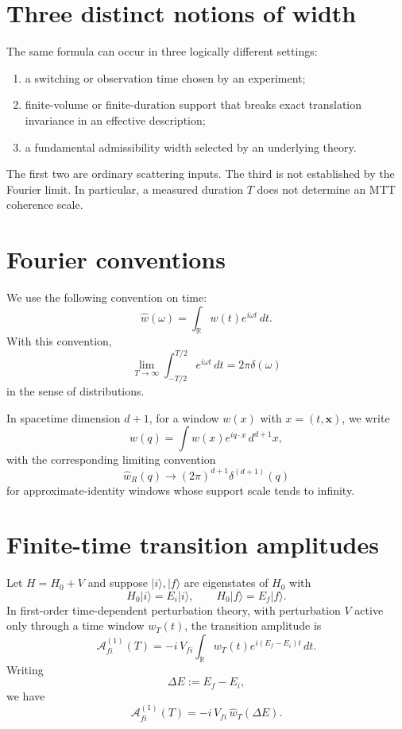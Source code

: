 \documentclass[11pt]{article}
\begin{document}
\section{Three distinct notions of width}

The same formula can occur in three logically different settings:
\begin{enumerate}
\item a switching or observation time chosen by an experiment;
\item finite-volume or finite-duration support that breaks exact translation invariance in an
effective description;
\item a fundamental admissibility width selected by an underlying theory.
\end{enumerate}
The first two are ordinary scattering inputs.  The third is not established by the Fourier
limit.  In particular, a measured duration \(T\) does not determine an MTT coherence scale.

\section{Fourier conventions}

We use the following convention on time:
\[
\widehat w(\omega)=\int_{\mathbb R} w(t)e^{i\omega t}\,dt.
\]
With this convention,
\[
\lim_{T\to\infty}\int_{-T/2}^{T/2}e^{i\omega t}\,dt
=2\pi\delta(\omega)
\]
in the sense of distributions.

In spacetime dimension \(d+1\), for a window \(w(x)\) with \(x=(t,\mathbf x)\), we write
\[
\widehat w(q)=\int w(x)e^{iq\cdot x}\,d^{d+1}x,
\]
with the corresponding limiting convention
\[
\widehat w_R(q)\longrightarrow (2\pi)^{d+1}\delta^{(d+1)}(q)
\]
for approximate-identity windows whose support scale tends to infinity.

\section{Finite-time transition amplitudes}

Let \(H=H_0+V\) and suppose \(|i\rangle,|f\rangle\) are eigenstates of \(H_0\) with
\[
H_0|i\rangle=E_i|i\rangle,\qquad H_0|f\rangle=E_f|f\rangle.
\]
In first-order time-dependent perturbation theory, with perturbation \(V\) active only through a time window \(w_T(t)\), the transition amplitude is
\[
\mathcal A_{fi}^{(1)}(T)
=
-i\,V_{fi}\int_{\mathbb R} w_T(t)e^{i(E_f-E_i)t}\,dt.
\]
Writing
\[
\Delta E:=E_f-E_i,
\]
we have
\[
\mathcal A_{fi}^{(1)}(T)
=
-i\,V_{fi}\,\widehat w_T(\Delta E).
\]
\end{document}
